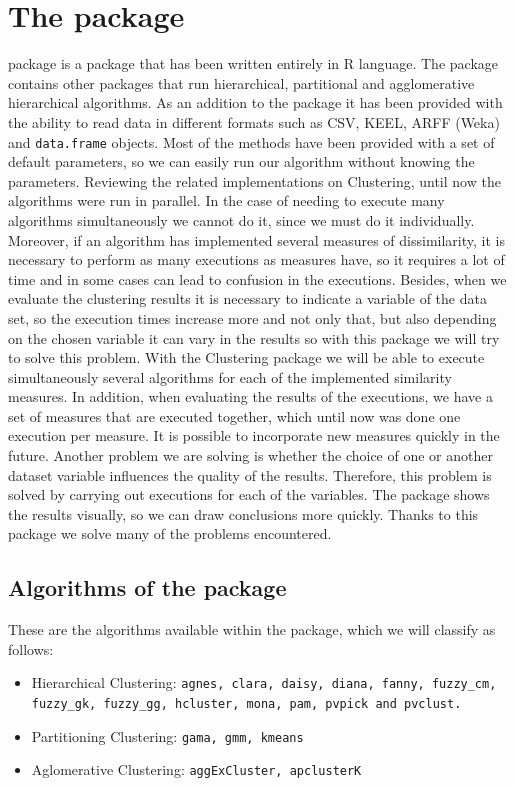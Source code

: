 \section{The  package}\label{clusteringpackage}
 package is a package that has been written entirely in R language. The package contains other  packages that run hierarchical, partitional and agglomerative hierarchical algorithms. As an addition to the package it has been provided with the ability to read data in different formats such as CSV, KEEL, ARFF (Weka) and \texttt{data.frame} objects. Most of the methods have been provided with a set of default parameters, so we can easily run our algorithm without knowing the parameters. Reviewing the related implementations on Clustering, until now the algorithms were run in parallel. In the case of needing to execute many algorithms simultaneously we cannot do it, since we must do it individually. Moreover, if an algorithm has implemented several measures of dissimilarity, it is necessary to perform as many executions as measures have, so it requires a lot of time and in some cases can lead to confusion in the executions. Besides, when we evaluate the clustering results it is necessary to indicate a variable of the data set, so the execution times increase more and not only that, but also depending on the chosen variable it can vary in the results so with this package we will try to solve this problem. With the Clustering package we will be able to execute simultaneously several algorithms for each of the implemented similarity measures. In addition, when evaluating the results of the executions, we have a set of measures that are executed together, which until now was done one execution per measure. It is possible to incorporate new measures quickly in the future. Another problem we are solving is whether the choice of one or another dataset variable influences the quality of the results. Therefore, this problem is solved by carrying out executions for each of the variables. The package shows the results visually, so we can draw conclusions more quickly.  Thanks to this package we solve many of the problems encountered.

\subsection{Algorithms of the package}
These are the algorithms available within the package, which we will classify as follows:
\begin{itemize}
  \item Hierarchical Clustering: \texttt{agnes, clara, daisy, diana, fanny, fuzzy\_cm, fuzzy\_gk, fuzzy\_gg, hcluster, mona, pam, pvpick and pvclust.}
  \item Partitioning Clustering: \texttt{gama, gmm, kmeans}
  \item Aglomerative Clustering: \texttt{aggExCluster, apclusterK}
\end{itemize}

